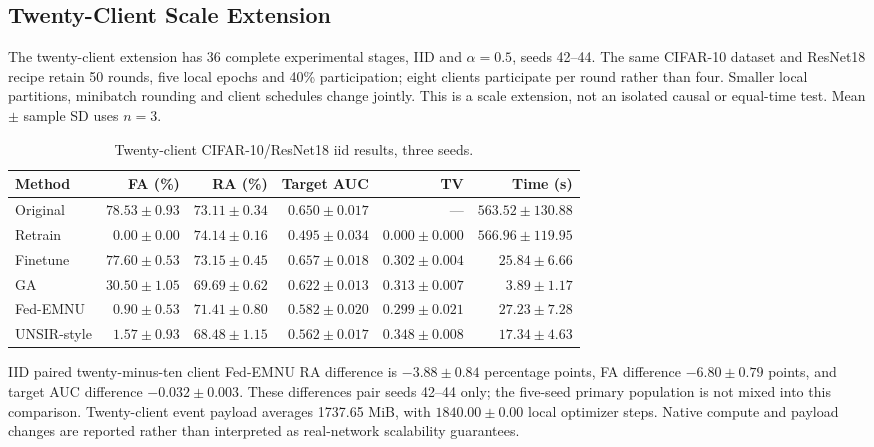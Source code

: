 \subsection{Twenty-Client Scale Extension}

\label{sec:clients20}

The twenty-client extension has 36 complete experimental stages, IID and $\alpha=0.5$, seeds 42--44. The same CIFAR-10 dataset and ResNet18 recipe retain 50 rounds, five local epochs and 40\% participation; eight clients participate per round rather than four. Smaller local partitions, minibatch rounding and client schedules change jointly. This is a scale extension, not an isolated causal or equal-time test. Mean $\pm$ sample SD uses $n=3$.

\begin{table}[H]
\caption{Twenty-client CIFAR-10/ResNet18 iid results, three seeds.}
\label{tab:clients20-iid}
\centering\scriptsize\setlength{\tabcolsep}{3.5pt}
\begin{tabular}{lrrrrr}
\toprule
Method & FA (\%) & RA (\%) & Target AUC & TV & Time (s)\\
\midrule
Original & $78.53 \pm 0.93$ & $73.11 \pm 0.34$ & $0.650 \pm 0.017$ & --- & $563.52 \pm 130.88$\\
Retrain & $0.00 \pm 0.00$ & $74.14 \pm 0.16$ & $0.495 \pm 0.034$ & $0.000 \pm 0.000$ & $566.96 \pm 119.95$\\
Finetune & $77.60 \pm 0.53$ & $73.15 \pm 0.45$ & $0.657 \pm 0.018$ & $0.302 \pm 0.004$ & $25.84 \pm 6.66$\\
GA & $30.50 \pm 1.05$ & $69.69 \pm 0.62$ & $0.622 \pm 0.013$ & $0.313 \pm 0.007$ & $3.89 \pm 1.17$\\
Fed-EMNU & $0.90 \pm 0.53$ & $71.41 \pm 0.80$ & $0.582 \pm 0.020$ & $0.299 \pm 0.021$ & $27.23 \pm 7.28$\\
UNSIR-style & $1.57 \pm 0.93$ & $68.48 \pm 1.15$ & $0.562 \pm 0.017$ & $0.348 \pm 0.008$ & $17.34 \pm 4.63$\\
\bottomrule
\end{tabular}
\end{table}

IID paired twenty-minus-ten client Fed-EMNU RA difference is $-3.88 \pm 0.84$ percentage points, FA difference $-6.80 \pm 0.79$ points, and target AUC difference $-0.032 \pm 0.003$. These differences pair seeds 42--44 only; the five-seed primary population is not mixed into this comparison. Twenty-client event payload averages 1737.65 MiB, with $1840.00 \pm 0.00$ local optimizer steps. Native compute and payload changes are reported rather than interpreted as real-network scalability guarantees.

